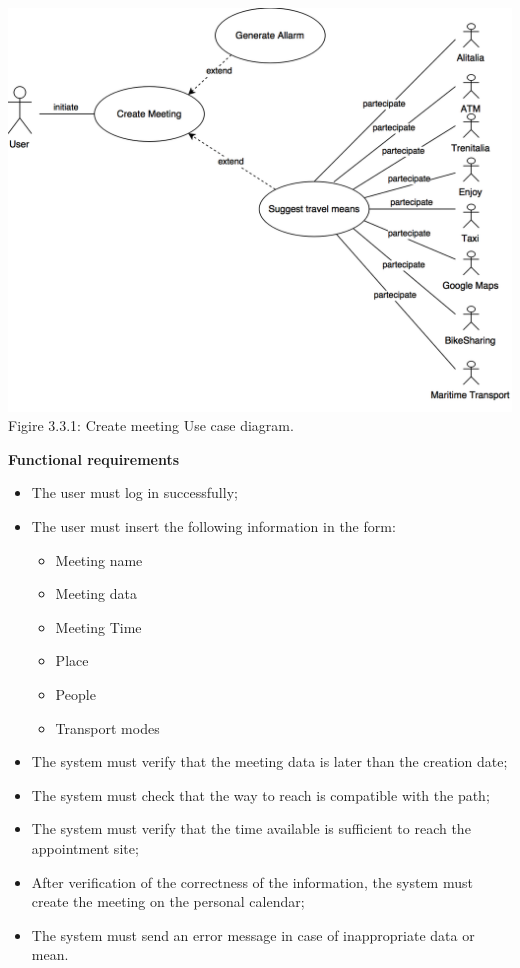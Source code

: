 \documentclass{article}
\begin{document}
	\bigskip
	\begin{center}
		\includegraphics[scale=0.25]{img/diagrams/create_meeting_uc.png} \\  \bigskip
		Figire 3.3.1: Create meeting Use case diagram.
	\end{center}
	
	\bigskip
	\noindent
	\textbf{Functional requirements} \\
	\begin{itemize}
		\item The user must log in successfully;
		\item The user must insert the following information in the form:
			\begin{itemize}
				\item Meeting name
				\item Meeting data
				\item Meeting Time
				\item Place
				\item People
				\item Transport modes
			\end{itemize}
		\item The system must verify that the meeting data is later than the creation date;
		\item The system must check that the way to reach is compatible with the path;
		\item The system must verify that the time available is sufficient to reach the appointment site;
		\item After verification of the correctness of the information, the system must create the meeting on the personal calendar;
		\item The system must send an error message in case of inappropriate data or mean.
	\end{itemize}
	
\end{document}
